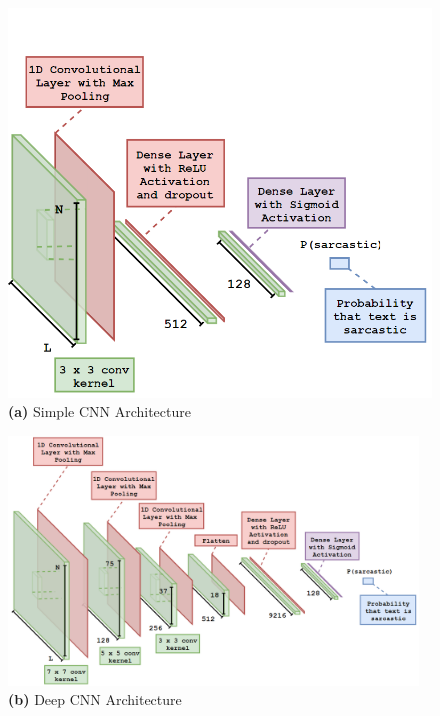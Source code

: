 \documentclass[12pt,a4paper]{article}
\begin{document}
\hspace{-20pt}\begin{minipage}{0.4\textwidth}
	\begin{figure}[H]
		\includegraphics[width=1\textwidth]{Images/CNNarchNew.png}
		\centering\textbf{(a)} Simple CNN Architecture\\
	\end{figure}
\end{minipage}
\hspace{10pt}
\begin{minipage}{0.6\textwidth}
	\begin{figure}[H]
		\includegraphics[width=0.97\textwidth]{Images/DCNNarchNew.png}
		\centering\textbf{(b)} Deep CNN Architecture\\
	\end{figure}
\end{minipage}\\\vspace{-7pt}
\end{document}
